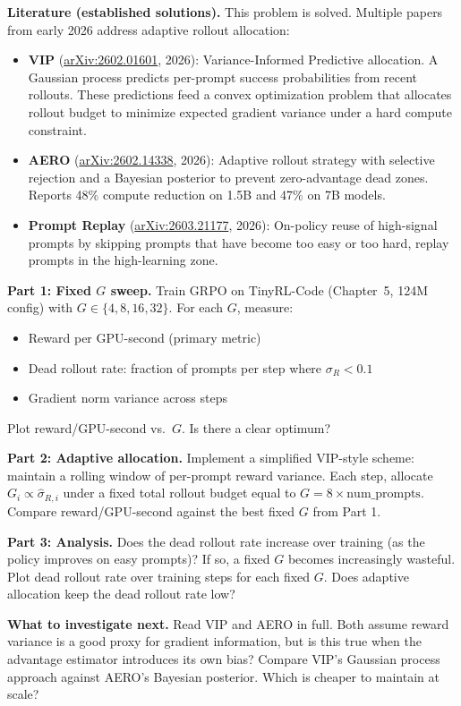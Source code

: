 \textbf{Literature (established solutions).} This problem is solved. Multiple papers from early 2026 address adaptive rollout allocation:

\begin{itemize}
  \item \textbf{VIP} (\href{https://arxiv.org/abs/2602.01601}{arXiv:2602.01601}, 2026): Variance-Informed Predictive allocation. A Gaussian process predicts per-prompt success probabilities from recent rollouts. These predictions feed a convex optimization problem that allocates rollout budget to minimize expected gradient variance under a hard compute constraint.
  \item \textbf{AERO} (\href{https://arxiv.org/abs/2602.14338}{arXiv:2602.14338}, 2026): Adaptive rollout strategy with selective rejection and a Bayesian posterior to prevent zero-advantage dead zones. Reports 48\% compute reduction on 1.5B and 47\% on 7B models.
  \item \textbf{Prompt Replay} (\href{https://arxiv.org/abs/2603.21177}{arXiv:2603.21177}, 2026): On-policy reuse of high-signal prompts by skipping prompts that have become too easy or too hard, replay prompts in the high-learning zone.
\end{itemize}

\begin{exercise}

\textbf{Part 1: Fixed $G$ sweep.} Train GRPO on TinyRL-Code (Chapter~5, 124M config) with $G \in \{4, 8, 16, 32\}$. For each $G$, measure:
\begin{itemize}
  \item Reward per GPU-second (primary metric)
  \item Dead rollout rate: fraction of prompts per step where $\sigma_R < 0.1$
  \item Gradient norm variance across steps
\end{itemize}
Plot reward/GPU-second vs.\ $G$. Is there a clear optimum?

\textbf{Part 2: Adaptive allocation.} Implement a simplified VIP-style scheme: maintain a rolling window of per-prompt reward variance. Each step, allocate $G_i \propto \hat{\sigma}_{R,i}$ under a fixed total rollout budget equal to $G = 8 \times \text{num\_prompts}$. Compare reward/GPU-second against the best fixed $G$ from Part 1.

\textbf{Part 3: Analysis.} Does the dead rollout rate increase over training (as the policy improves on easy prompts)? If so, a fixed $G$ becomes increasingly wasteful. Plot dead rollout rate over training steps for each fixed $G$. Does adaptive allocation keep the dead rollout rate low?

\textbf{What to investigate next.} Read VIP and AERO in full. Both assume reward variance is a good proxy for gradient information, but is this true when the advantage estimator introduces its own bias? Compare VIP's Gaussian process approach against AERO's Bayesian posterior. Which is cheaper to maintain at scale?
\end{exercise}

